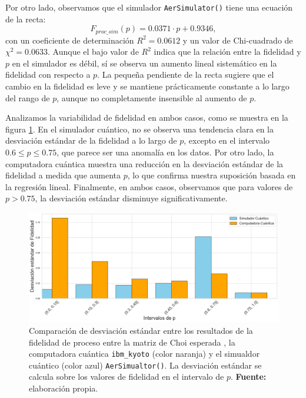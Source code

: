 \documentclass[letterpaper,12pt]{thesisECFM}
\theoremstyle{plain}
\theoremstyle{definition}
\theoremstyle{definition}
\theoremstyle{remark}
\newcommand{\1}{\mathbb{1}}
\begin{document}
Por otro lado, observamos que el simulador \texttt{AerSimulator()} tiene una
ecuación de la recta:
\begin{equation}
    F_{proc\_sim}(p) = 0.0371 \cdot p + 0.9346,
\end{equation}
con un coeficiente de determinación $R^2 = 0.0612$ y un valor de Chi-cuadrado
de $\chi^2 = 0.0633$. 
Aunque el bajo valor de $R^2$ indica que la relación entre la fidelidad y $p$
en el simulador es débil, sí se observa un aumento lineal sistemático en la
fidelidad con respecto a $p$. La pequeña pendiente de la recta sugiere que el
cambio en la fidelidad es leve y se mantiene prácticamente constante a lo largo
del rango de $p$, aunque no completamente insensible al aumento de $p$.

Analizamos la variabilidad de fidelidad en ambos casos, como se muestra en la
figura \ref{fig:comparacion_desviaciones}. En el simulador cuántico, no se
observa una tendencia clara en la desviación estándar de la fidelidad a lo
largo de $p$, excepto en el intervalo $0.6 \le p \leq 0.75$, que parece ser una
anomalía en los datos. Por otro lado, la computadora cuántica muestra una
reducción en la desviación estándar de la fidelidad a medida que aumenta $p$,
lo que confirma nuestra suposición basada en la regresión lineal. Finalmente,
en ambos casos, observamos que para valores de $p>0.75$, la desviación estándar
disminuye significativamente. 


\begin{figure}[h!] %
    \centering
    \includegraphics[width=0.95\linewidth]{imagenes/Comparacion_desviaciones.png}
    \caption{Comparación de desviación estándar entre los resultados de la fidelidad de proceso entre la matriz de Choi esperada , la computadora cuántica \texttt{ibm\_kyoto} (color naranja) y el simualdor cuántico (color azul) \texttt{AerSimualtor()}. La desviación estándar se calcula sobre los valores de fidelidad en el intervalo de $p$. \textbf{Fuente:} elaboración propia.}
    \label{fig:comparacion_desviaciones}
\end{figure} %
\end{document}
